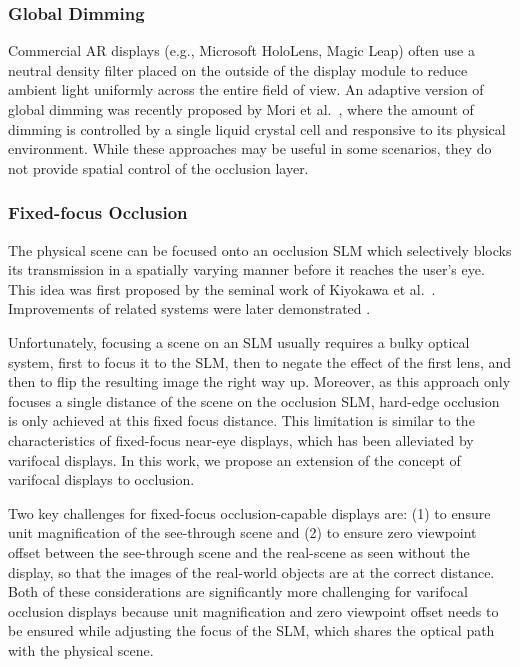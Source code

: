 \subsubsection{Global Dimming} 

Commercial AR displays (e.g., Microsoft HoloLens, Magic Leap) often use a neutral density filter placed on the outside of the display module to reduce ambient light uniformly across the entire field of view.
An adaptive version of global dimming was recently proposed by Mori et al.~\cite{Mori2018}, where the amount of dimming is controlled by a single liquid crystal cell and responsive to its physical environment. While these approaches may be useful in some scenarios, they do not provide spatial control of the occlusion layer.


\subsubsection{Fixed-focus Occlusion} 
\label{sec:varifocal_occlusion:related:fixedfocusOcc}
The physical scene can be focused onto an occlusion SLM which selectively blocks its transmission in a spatially varying manner before it reaches the user's eye. This idea was first proposed by the seminal work of Kiyokawa et al.~\cite{Kiyokawa2000,Kiyokawa2001,Kiyokawa2003}. Improvements of related systems were later demonstrated \cite{Cakmakci2004, Cakmakci2005, Wilson2017, Howlett2017, Wetzstein2010, Gao2012, Gao2013optical}. 

Unfortunately, focusing a scene on an SLM usually requires a bulky optical system, first to focus it to the SLM, then to negate the effect of the first lens, and then to flip the resulting image the right way up. Moreover, as this approach only focuses a single distance of the scene on the occlusion SLM, hard-edge occlusion is only achieved at this fixed focus distance. This limitation is similar to the characteristics of fixed-focus near-eye displays, which has been alleviated by varifocal displays. In this work, we propose an extension of the concept of varifocal displays to occlusion.

Two key challenges for fixed-focus occlusion-capable displays are: (1) to ensure unit magnification of the see-through scene and (2) to ensure zero viewpoint offset between the see-through scene and the real-scene as seen without the display, so that the images of the real-world objects are at the correct distance. Both of these considerations are significantly more challenging for varifocal occlusion displays because unit magnification and zero viewpoint offset needs to be ensured while adjusting the focus of the SLM, which shares the optical path with the physical scene. 

